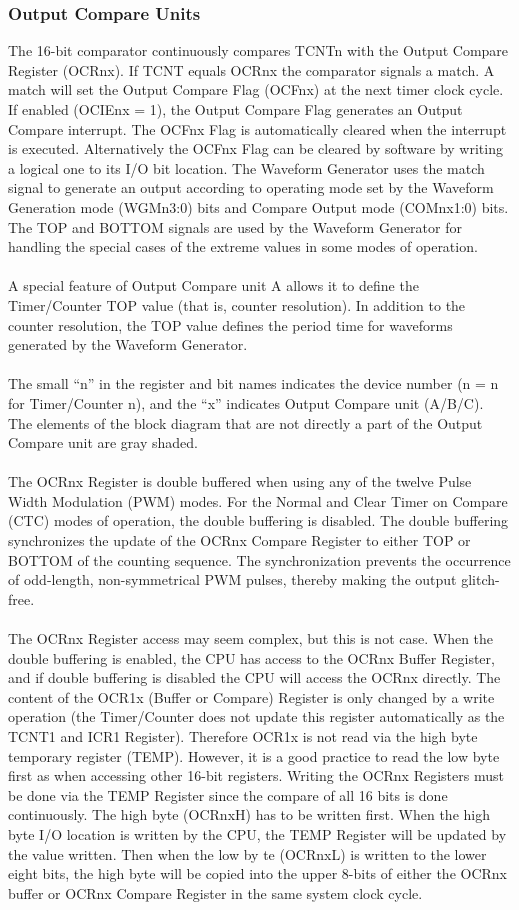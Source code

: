\documentclass[english]{article}
\begin{document}
\subsubsection{Output Compare Units}
The 16-bit comparator continuously compares TCNTn with the Output Compare Register (OCRnx). If TCNT equals OCRnx the comparator signals a match. A match will set the Output Compare Flag (OCFnx) at the next timer clock cycle. If enabled (OCIEnx = 1), the Output Compare Flag generates an Output Compare interrupt. The OCFnx Flag is automatically cleared when the interrupt is executed. Alternatively the OCFnx Flag can be cleared by software by writing a logical one to its I/O bit location. The Waveform Generator uses the match signal to generate an output according to operating mode set by the Waveform Generation mode (WGMn3:0) bits and Compare Output mode (COMnx1:0) bits. The TOP and BOTTOM signals are used by the Waveform Generator for handling the special cases of the extreme values in
some modes of operation. \\\\
A special feature of Output Compare unit A allows it to define the Timer/Counter TOP value (that
is, counter resolution). In addition to the counter resolution, the TOP value defines the period
time for waveforms generated by the Waveform Generator.\\\\
The small “n” in the register and bit names indicates the device number (n = n for Timer/Counter n), and the “x” indicates Output Compare unit (A/B/C). The elements of the block diagram that are not directly a part of the Output Compare unit are gray shaded.\\\\
The OCRnx Register is double buffered when using any of the twelve Pulse Width Modulation (PWM) modes. For the Normal and Clear Timer on Compare (CTC) modes of operation, the double buffering is disabled. The double buffering synchronizes the update of the OCRnx Compare Register to either TOP or BOTTOM of the counting sequence. The synchronization prevents the occurrence of odd-length, non-symmetrical PWM pulses, thereby making the output glitch-free.\\\\
The OCRnx Register access may seem complex, but this is not case. When the double buffering
is enabled, the CPU has access to the OCRnx Buffer Register, and if double buffering is disabled the CPU will access the OCRnx directly. The content of the OCR1x (Buffer or Compare) Register is only changed by a write operation (the Timer/Counter does not update this register automatically as the TCNT1 and ICR1 Register). Therefore OCR1x is not read via the high byte temporary register (TEMP). However, it is a good practice to read the low byte first as when accessing other 16-bit registers.
Writing the OCRnx Registers must be done via the TEMP Register since the compare of all 16 bits is done continuously. The high byte (OCRnxH) has to be written first. When the high byte I/O location is written by the CPU, the TEMP Register will be updated by the value written. Then when the low by
te (OCRnxL) is written to the lower eight bits, the high byte will be copied into the upper 8-bits
of either the OCRnx buffer or OCRnx Compare Register in the same system clock cycle.
\end{document}
